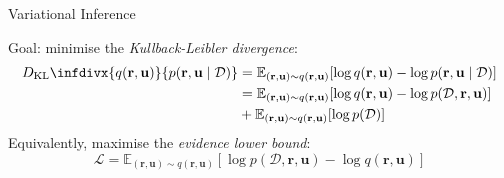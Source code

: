 \documentclass{beamer}
\newcommand{\DKL}{D_{\mathrm{KL}}\infdivx}
\begin{document}
\begin{frame}{Variational Inference}
  \begin{figure}
    \centering
  \end{figure}
  Goal: \alert{minimise} the \emph{Kullback-Leibler divergence}:
  \[
    \begin{split}
      \DKL{q(\mathbf{r}, \mathbf{u})}{p(\mathbf{r}, \mathbf{u} \mid \mathcal{D})}
      &= \mathbb{E}_{(\mathbf{r}, \mathbf{u}) \sim q(\mathbf{r}, \mathbf{u})}[\log
      q(\mathbf{r}, \mathbf{u}) - \log p(\mathbf{r}, \mathbf{u} \mid
      \mathcal{D})] \\
      &= \mathbb{E}_{(\mathbf{r}, \mathbf{u}) \sim q(\mathbf{r},
        \mathbf{u})}[\log q(\mathbf{r}, \mathbf{u}) - \log p(\mathcal{D},
      \mathbf{r}, \mathbf{u})] \\
      &+ \mathbb{E}_{(\mathbf{r}, \mathbf{u}) \sim q(\mathbf{r},
        \mathbf{u})}[\log p(\mathcal{D})]
    \end{split}
  \]
  Equivalently, \alert{maximise} the \emph{evidence lower bound}:
  \[
    \mathcal{L} = \mathbb{E}_{(\mathbf{r}, \mathbf{u}) \sim q(\mathbf{r},
      \mathbf{u})}[\log p(\mathcal{D}, \mathbf{r}, \mathbf{u}) - \log
    q(\mathbf{r}, \mathbf{u})]
  \]
\end{frame}
\end{document}
